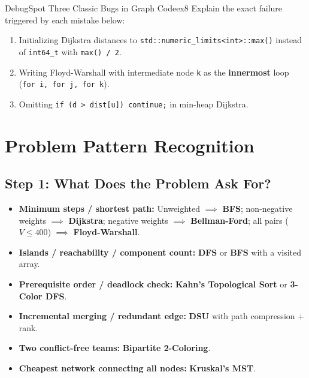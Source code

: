 \documentclass[11pt,a4paper]{article}
\theoremstyle{definition}
\begin{document}
\begin{tryitbox}{Debug}{Spot Three Classic Bugs in Graph Code}{ex8}
Explain the exact failure triggered by each mistake below:
\begin{enumerate}
    \item Initializing Dijkstra distances to \texttt{std::numeric\_limits<int>::max()} instead of \texttt{int64\_t} with \texttt{max() / 2}.
    \item Writing Floyd-Warshall with intermediate node \texttt{k} as the \textbf{innermost} loop (\texttt{for i, for j, for k}).
    \item Omitting \texttt{if (d > dist[u]) continue;} in min-heap Dijkstra.
\end{enumerate}
\end{tryitbox}

\section{Problem Pattern Recognition}

\subsection*{Step 1: What Does the Problem Ask For?}
\begin{itemize}
    \item \textbf{Minimum steps / shortest path:} Unweighted $\implies$ \textbf{BFS}; non-negative weights $\implies$ \textbf{Dijkstra}; negative weights $\implies$ \textbf{Bellman-Ford}; all pairs ($V \le 400$) $\implies$ \textbf{Floyd-Warshall}.
    \item \textbf{Islands / reachability / component count:} \textbf{DFS} or \textbf{BFS} with a visited array.
    \item \textbf{Prerequisite order / deadlock check:} \textbf{Kahn's Topological Sort} or \textbf{3-Color DFS}.
    \item \textbf{Incremental merging / redundant edge:} \textbf{DSU} with path compression + rank.
    \item \textbf{Two conflict-free teams:} \textbf{Bipartite 2-Coloring}.
    \item \textbf{Cheapest network connecting all nodes:} \textbf{Kruskal's MST}.
\end{itemize}
\end{document}
